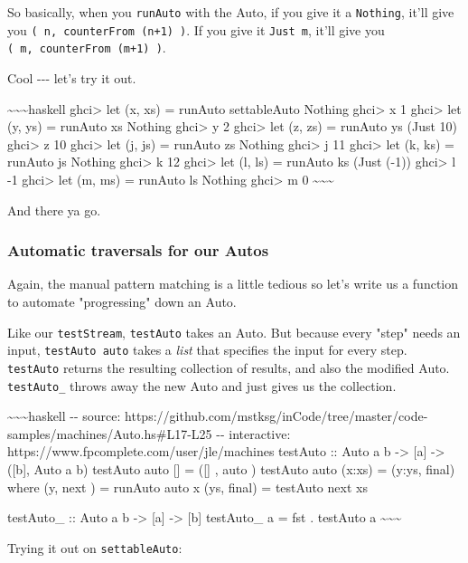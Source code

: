 \documentclass[]{article}
\begin{document}
So basically, when you \texttt{runAuto} with the Auto, if you give it a
\texttt{Nothing}, it'll give you \texttt{(\ n,\ counterFrom\ (n+1)\ )}. If you
give it \texttt{Just\ m}, it'll give you \texttt{(\ m,\ counterFrom\ (m+1)\ )}.

Cool -\/-\/- let's try it out.

\textasciitilde{}\textasciitilde{}\textasciitilde{}haskell ghci\textgreater{}
let (x, xs) = runAuto settableAuto Nothing ghci\textgreater{} x 1
ghci\textgreater{} let (y, ys) = runAuto xs Nothing ghci\textgreater{} y 2
ghci\textgreater{} let (z, zs) = runAuto ys (Just 10) ghci\textgreater{} z 10
ghci\textgreater{} let (j, js) = runAuto zs Nothing ghci\textgreater{} j 11
ghci\textgreater{} let (k, ks) = runAuto js Nothing ghci\textgreater{} k 12
ghci\textgreater{} let (l, ls) = runAuto ks (Just (-1)) ghci\textgreater{} l -1
ghci\textgreater{} let (m, ms) = runAuto ls Nothing ghci\textgreater{} m 0
\textasciitilde{}\textasciitilde{}\textasciitilde{}

And there ya go.

\subsubsection{Automatic traversals for our Autos}

Again, the manual pattern matching is a little tedious so let's write us a
function to automate "progressing" down an Auto.

Like our \texttt{testStream}, \texttt{testAuto} takes an Auto. But because every
"step" needs an input, \texttt{testAuto\ auto} takes a \emph{list} that
specifies the input for every step. \texttt{testAuto} returns the resulting
collection of results, and also the modified Auto. \texttt{testAuto\_} throws
away the new Auto and just gives us the collection.

\textasciitilde{}\textasciitilde{}\textasciitilde{}haskell -\/- source:
https://github.com/mstksg/inCode/tree/master/code-samples/machines/Auto.hs\#L17-L25
-\/- interactive: https://www.fpcomplete.com/user/jle/machines testAuto :: Auto
a b -\textgreater{} {[}a{]} -\textgreater{} ({[}b{]}, Auto a b) testAuto auto
{[}{]} = ({[}{]} , auto ) testAuto auto (x:xs) = (y:ys, final) where (y, next )
= runAuto auto x (ys, final) = testAuto next xs

testAuto\_ :: Auto a b -\textgreater{} {[}a{]} -\textgreater{} {[}b{]}
testAuto\_ a = fst . testAuto a
\textasciitilde{}\textasciitilde{}\textasciitilde{}

Trying it out on \texttt{settableAuto}:
\end{document}

